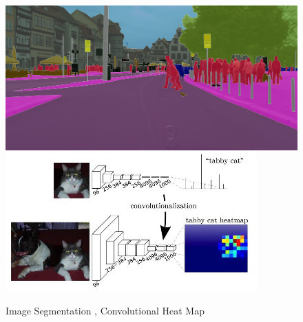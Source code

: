 \documentclass[a4paper,11pt,notitlepage]{article}
\begin{document}
\noindent \begin{figure}[h!]
\includegraphics[width = 0.5\hsize]{./figures/image_seg1.png}
\includegraphics[width = 0.5\hsize]{./figures/sem_im_seg1.jpg}
\caption{Image Segmentation \cite{DBLP:journals/corr/CordtsORREBFRS16}, Convolutional Heat Map \cite{DBLP:journals/corr/LongSD14}}
\label{cityscapes_data}
\end{figure}
\end{document}
